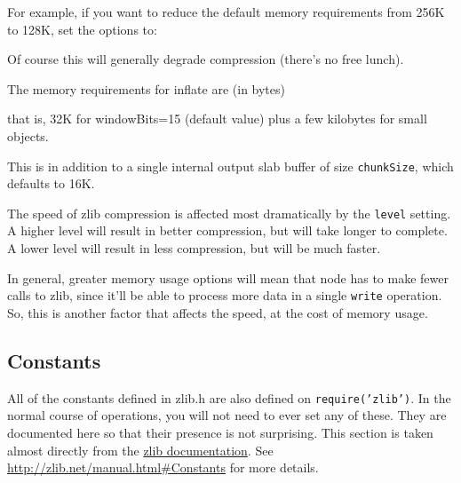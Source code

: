 For example, if you want to reduce the default memory requirements from
256K to 128K, set the options to:

\begin{Shaded}
\begin{Highlighting}[]
\NormalTok{\{ }\NormalTok{: }\NormalTok{, }\NormalTok{: } \NormalTok{\}}
\end{Highlighting}
\end{Shaded}

Of course this will generally degrade compression (there's no free
lunch).

The memory requirements for inflate are (in bytes)

\begin{Shaded}
\begin{Highlighting}[]
 
\end{Highlighting}
\end{Shaded}

that is, 32K for windowBits=15 (default value) plus a few kilobytes for
small objects.

This is in addition to a single internal output slab buffer of size
\texttt{chunkSize}, which defaults to 16K.

The speed of zlib compression is affected most dramatically by the
\texttt{level} setting. A higher level will result in better
compression, but will take longer to complete. A lower level will result
in less compression, but will be much faster.

In general, greater memory usage options will mean that node has to make
fewer calls to zlib, since it'll be able to process more data in a
single \texttt{write} operation. So, this is another factor that affects
the speed, at the cost of memory usage.

\subsection{Constants}

All of the constants defined in zlib.h are also defined on
\texttt{require('zlib')}. In the normal course of operations, you will
not need to ever set any of these. They are documented here so that
their presence is not surprising. This section is taken almost directly
from the \href{http://zlib.net/manual.html\#Constants}{zlib
documentation}. See \url{http://zlib.net/manual.html#Constants} for more
details.

